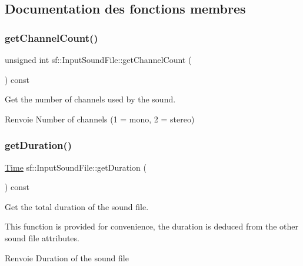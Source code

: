 \subsection{Documentation des fonctions membres}
\mbox{\label{classsf_1_1InputSoundFile_a54307c308ba05dea63aba54a29c804a4}} 
\subsubsection{\texorpdfstring{get\+Channel\+Count()}{getChannelCount()}}
{\footnotesize\ttfamily unsigned int sf\+::\+Input\+Sound\+File\+::get\+Channel\+Count (\begin{DoxyParamCaption}{ }\end{DoxyParamCaption}) const}



Get the number of channels used by the sound. 

\begin{DoxyReturn}{Renvoie}
Number of channels (1 = mono, 2 = stereo) 
\end{DoxyReturn}
\mbox{\label{classsf_1_1InputSoundFile_aa081bd4d9732408d10b48227a360778e}} 
\subsubsection{\texorpdfstring{get\+Duration()}{getDuration()}}
{\footnotesize\ttfamily \hyperlink{classsf_1_1Time}{Time} sf\+::\+Input\+Sound\+File\+::get\+Duration (\begin{DoxyParamCaption}{ }\end{DoxyParamCaption}) const}



Get the total duration of the sound file. 

This function is provided for convenience, the duration is deduced from the other sound file attributes.

\begin{DoxyReturn}{Renvoie}
Duration of the sound file 
\end{DoxyReturn}
\mbox{\label{classsf_1_1InputSoundFile_a665b7fed6cdca3e0c622909e5a6655e4}} 
